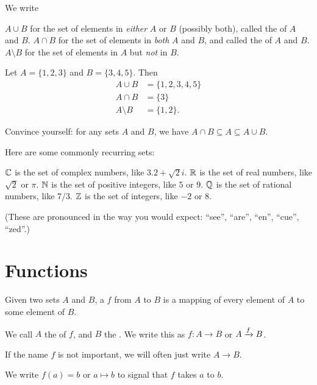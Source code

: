 \begin{definition}
	We write
	\begin{itemize}
		\ii $A \cup B$ for the set of elements in
		\emph{either} $A$ or $B$ (possibly both),
		called the  of $A$ and $B$.
		\ii $A \cap B$ for the set of elements in \emph{both} $A$ and $B$, and
		called the  of $A$ and $B$.
		\ii $A \setminus B$ for the set of elements in $A$ but \emph{not} in $B$.
	\end{itemize}
\end{definition}

\begin{example}
	Let $A = \{1,2,3\}$ and $B = \{3,4,5\}$. Then
	\begin{align*}
		A \cup B &= \{1,2,3,4,5\} \\
		A \cap B &= \{3\} \\
		A \setminus B &= \{1,2\}.
	\end{align*}
\end{example}

\begin{exercise}
	Convince yourself: for any sets $A$ and $B$,
	we have $A \cap B \subseteq A \subseteq A \cup B$.
\end{exercise}

Here are some commonly recurring sets:
\begin{itemize}
	\ii $\mathbb C$ is the set of complex numbers, like $3.2 + \sqrt 2 i$.
	\ii $\mathbb R$ is the set of real numbers, like $\sqrt 2$ or $\pi$.
	\ii $\mathbb N$ is the set of positive integers, like $5$ or $9$.
	\ii $\mathbb Q$ is the set of rational numbers, like $7/3$.
	\ii $\mathbb Z$ is the set of integers, like $-2$ or $8$.
\end{itemize}
(These are pronounced in the way you would expect:
``see'', ``are'', ``en'', ``cue'', ``zed''.)

\section{Functions}
Given two sets $A$ and $B$, a  $f$ from $A$ to $B$
is a mapping of every element of $A$ to some element of $B$.

We call $A$ the  of $f$, and $B$ the .
We write this as $f : A \to B$ or $A \xrightarrow{f} B$.
\begin{abuse}
	If the name $f$ is not important, we will often just write $A \to B$.
\end{abuse}
We write $f(a) = b$ or $a \mapsto b$ to signal that $f$ takes $a$ to $b$.

